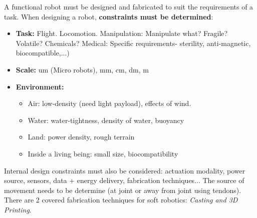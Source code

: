 \documentclass[onecolumn,a4paper]{article}
\begin{document}
A functional robot must be designed and fabricated to suit the requirements of a task. When designing a robot, \textbf{constraints must be determined}:
\begin{itemize}
    \item \textbf{Task:}
        Flight. Locomotion. Manipulation: Manipulate what? Fragile? Volatile? Chemicals? Medical: Specific requirements- sterility, anti-magnetic, biocompatible,...)
    \item \textbf{Scale:}
        um (Micro robots), mm, cm, dm, m
    \item \textbf{Environment:}
    \begin{itemize}
        \item Air: low-density (need light payload), effects of wind.     
        \item Water: water-tightness, density of water, buoyancy
        \item Land: power density, rough terrain
        \item Inside a living being: small size, biocompatibility
    \end{itemize}
\end{itemize}

Internal design constraints must also be considered: actuation modality, power source, sensors, data + energy delivery, fabrication techniques...  The source of movement needs to be determine (at joint or away from joint using tendons). There are 2 covered fabrication techniques for soft robotics: \emph{Casting and 3D Printing}.
\end{document}
